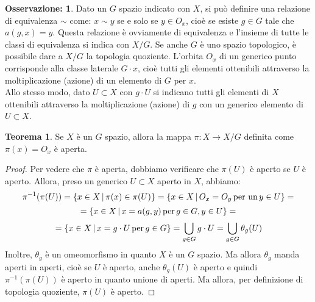 \documentclass[12pt,a4paper]{report}
\theoremstyle{definition}
\theoremstyle{Theorem}
\newtheorem{Theo}[Def]{Teorema}
\theoremstyle{definition}
\theoremstyle{definition}
\theoremstyle{definition}
\newtheorem{Obs}[Def]{Osservazione:}
\begin{document}
\begin{Obs}
	Dato un $G$ spazio indicato con $X$, si può definire una relazione di equivalenza $\sim$ come: $x\sim y$ se e solo se $y\in O_x$, cioè se esiste $g\in G$ tale che $a(g,x)=y$. Questa relazione è ovviamente di equivalenza e l'insieme di tutte le classi di equivalenza si indica con $X/G$. Se anche $G$ è uno spazio topologico, è possibile dare a $X/G$ la topologia quoziente. 
	L'orbita $O_x$ di un generico punto corrisponde alla classe laterale $G\cdot x$, cioè tutti gli elementi ottenibili attraverso la moltiplicazione (azione) di un elemento di $G$ per $x$. \\
	Allo stesso modo, dato $U\subset X$ con $g\cdot U$ si indicano tutti gli elementi di $X$ ottenibili attraverso la moltiplicazione (azione) di $g$ con un generico elemento di $U\subset X$. 
\end{Obs}
\begin{Theo}
	Se $X$ è un $G$ spazio, allora la mappa $\pi:X\rightarrow X/G$ definita come $\pi(x)=O_x$ è aperta.
\end{Theo}
\begin{proof}
	Per vedere che $\pi$ è aperta, dobbiamo verificare che $\pi(U)$ è aperto se $U$ è aperto. Allora, preso un generico $U\subset X$ aperto in $X$, abbiamo:
	$$\pi^{-1}(\pi(U))=\{x\in X \,|\, \pi(x)\in \pi(U)\}=\{x\in X \,|\, O_x=O_y \,\hbox{per un} \, y\in U\}=$$
	$$=\{x\in X \, | \, x=a(g,y) \, \hbox{per} \, g\in G, y\in U\}=$$
	$$=\{x\in X \, | \, x=g\cdot U \, \hbox{per} \, g\in G\}= \bigcup_{g\in G} g\cdot U=\bigcup_{g\in G}\theta_g(U)$$
	Inoltre, $\theta_g$ è un omeomorfismo in quanto $X$ è un $G$ spazio. Ma allora $\theta_g$ manda aperti in aperti, cioè se $U$ è aperto, anche $\theta_g(U)$ è aperto e quindi $\pi^{-1}(\pi(U))$ è aperto in quanto unione di aperti. Ma allora, per definizione di topologia quoziente, $\pi(U)$ è aperto.
\end{proof}
\end{document}
